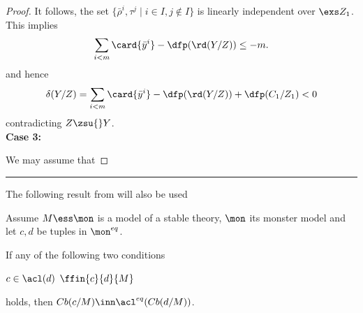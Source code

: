 \documentclass[11pt,english]{article}
\begin{document}
\begin{proof}
It follows, the set $\{\bar\rho^{i},\tau^{j}\mid i\in I, j\notin I\}$ is linearly independent over $\exs Z_{1}$.
This implies
$$\sum_{i<m}\card{\bar y^{i}}-\dfp(\rd(Y/Z))\leq-m.$$
and hence
$$\delta(Y/Z)=\sum_{i<m}\card{\bar y^{i}}-\dfp(\rd(Y/Z))+\dfp(C_{1}/Z_{1})<0$$
contradicting $Z\zsu{}Y$.\\[+1mm]\noindent
{\bf Case 3:}

\smallskip
We may assume that

\end{proof}

\rule{\textwidth}{1pt}


\bigskip
The following result from \cite{pilcm} will also be used
\begin{fact}\label{pilcb}
Assume $M\ess\mon$ is a model of a stable theory, $\mon$ its monster model and let $c,d$ be tuples in $\mon^{eq}$.

If any of the following two conditions
\begin{itemize}
$c\in\acl(d)$ %
$\ffin{c}{d}{M}$ %
\end{itemize}
holds, then $Cb(c/M)\inn\acl^{eq}(Cb(d/M))$.
\end{fact}
\end{document}
